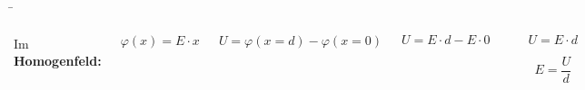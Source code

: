\begin{frame}
{	 


	}
\end{frame}


\begin{frame}

	\b{
	

	
	\begin{columns}
		\vspace{-10pt}
	  	Im \textbf{Homogenfeld:}

		\begin{equation*}
			\varphi(x) = E \cdot x
		\end{equation*}

		

		\begin{equation*}
			U = \varphi(x= d) - \varphi(x= 0) 
		\end{equation*}

		\begin{equation*}
			U =  E \cdot d - E \cdot 0
		\end{equation*}
   


	\phantom{text}\\


		\begin{Merksatz}{}
			\begin{equation*}
				U = E \cdot d
			\end{equation*}

			\begin{equation*}
				E =  \frac{U}{d}
			\end{equation*}


		\end{Merksatz}
		





		\begin{figure}[h!]
			\centering
			
		\end{figure}

		\begin{figure}[h!]
			\centering
			

		\end{figure}
	\end{columns}
	



}
\end{frame}
